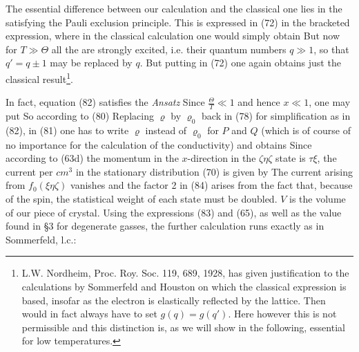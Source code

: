 \begin{paper}{1}
The essential difference between our calculation and the classical one lies in the  satisfying the Pauli exclusion principle.  This is expressed in (72) in the bracketed expression, where in the classical calculation one would simply obtain
But now for $T\gg\Theta$ all the  are strongly excited, i.e. their quantum numbers $q\gg 1$, so that $q'=q\pm 1$ may be replaced by $q$. But putting
in (72) one again obtains just the classical result\footnote{L.W. Nordheim, Proc. Roy. Soc. 119, 689, 1928, has given justification to the calculations by Sommerfeld and Houston on which the classical expression is based, insofar as the electron is elastically reflected by the lattice. Then would in fact always have to set $g(q)=g(q')$. Here however this is not permissible and this distinction is, as we will show in the following, essential for low temperatures.}.

In fact, equation (82) satisfies the \textit{Ansatz}
Since $\frac{\Theta}{T}\ll 1$ and hence $x\ll 1$, one may put
So according to (80)
Replacing $\varrho$ by $\varrho_0$ back in (78) for simplification as in (82), in (81) one has to write $\varrho$ instead of $\varrho_0$ for $P$ and $Q$ (which is of course of no importance for the calculation of the conductivity) and obtains
Since according to (63d) the momentum in the $x$-direction in the $\zeta\eta\zeta$ state is $\tau\xi$, the current per $\unit{cm}^3$ in the stationary distribution (70) is given by
The current arising from $f_0(\xi\eta\zeta)$ vanishes and the factor 2 in (84) arises from the fact that, because of the spin, the statistical weight  of each state must be doubled. $V$ is the volume of our piece of crystal. Using the expressions (83) and (65), as well as the value found in \S3 for degenerate gasses, the further calculation runs exactly as in Sommerfeld, l.c.:


\end{paper}
